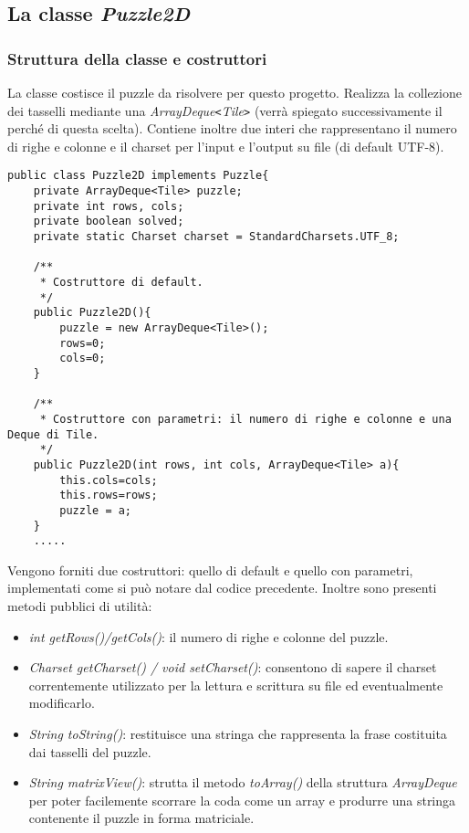 \documentclass{article}
\begin{document}
\subsection{La classe \textit{Puzzle2D }}
\subsubsection{Struttura della classe e costruttori}
La classe costisce il puzzle da risolvere per questo progetto. Realizza la collezione dei tasselli mediante una \textit{ArrayDeque\texttt{<}Tile\texttt{>}} (verrà spiegato successivamente il perché di questa scelta). Contiene inoltre due interi che rappresentano il numero di righe e colonne e il charset per l'input e l'output su file (di default UTF-8).
\begin{lstlisting}
public class Puzzle2D implements Puzzle{
    private ArrayDeque<Tile> puzzle;
    private int rows, cols;
    private boolean solved;
    private static Charset charset = StandardCharsets.UTF_8;

    /**
     * Costruttore di default.
     */
    public Puzzle2D(){
        puzzle = new ArrayDeque<Tile>();
        rows=0;
        cols=0;
    }

    /**
     * Costruttore con parametri: il numero di righe e colonne e una Deque di Tile.
     */
    public Puzzle2D(int rows, int cols, ArrayDeque<Tile> a){
        this.cols=cols;
        this.rows=rows;
        puzzle = a;
    }
    .....
\end{lstlisting}
Vengono forniti due costruttori: quello di default e quello con parametri, implementati come si può notare dal codice precedente.
Inoltre sono presenti metodi pubblici di utilità:
\begin{itemize}
\item \textit{int getRows()/getCols()}: il numero di righe e colonne del puzzle.
\item \textit{Charset getCharset() / void setCharset()}: consentono di sapere il charset correntemente utilizzato per la lettura e scrittura su file ed eventualmente modificarlo.
\item \textit{String toString()}: restituisce una stringa che rappresenta la frase costituita dai tasselli del puzzle.
\item \textit{String matrixView()}: strutta il metodo \textit{toArray()} della struttura \textit{ArrayDeque} per poter facilemente scorrare la coda come un array e produrre una stringa contenente il puzzle in forma matriciale.
\end{itemize}
\end{document}
